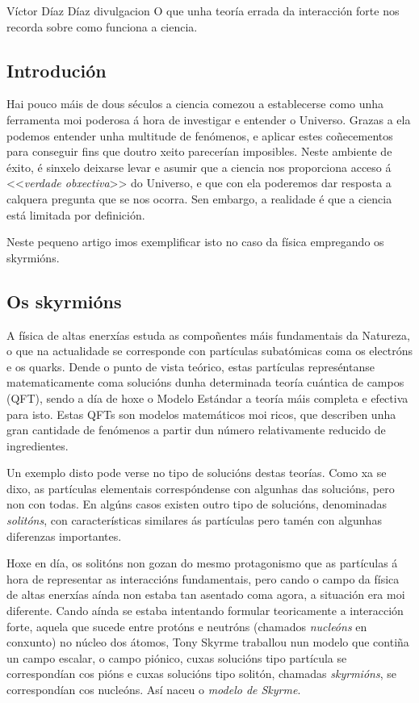 {Víctor Díaz Díaz}
{divulgacion}
{O que unha teoría errada da interacción forte nos recorda sobre como funciona
a ciencia.}

\begin{multicols}{2}

\subsection*{Introdución}

Hai pouco máis de dous séculos a ciencia comezou a establecerse como unha
ferramenta moi poderosa á hora de investigar e entender o Universo. Grazas a
ela podemos entender unha multitude de fenómenos, e aplicar estes coñecementos
para conseguir fins que doutro xeito parecerían imposibles. Neste ambiente de
éxito, é sinxelo deixarse levar e asumir que a ciencia nos proporciona acceso á
<<\textit{verdade obxectiva}>> do Universo, e que con ela poderemos dar
resposta a calquera pregunta que se nos ocorra. Sen embargo, a realidade é que
a ciencia está limitada por definición.

Neste pequeno artigo imos exemplificar isto no caso da física empregando os
skyrmións.

\subsection*{Os skyrmións}

A física de altas enerxías estuda as compoñentes máis fundamentais da Natureza,
o que na actualidade se corresponde con partículas subatómicas coma os
electróns e os quarks. Dende o punto de vista teórico, estas partículas
represéntanse matematicamente coma solucións dunha determinada teoría cuántica
de campos (QFT), sendo a día de hoxe o Modelo Estándar a teoría máis completa e
efectiva para isto. Estas QFTs son modelos matemáticos moi ricos, que describen
unha gran cantidade de fenómenos a partir dun número relativamente reducido de
ingredientes.

Un exemplo disto pode verse no tipo de solucións destas teorías. Como xa se
dixo, as partículas elementais correspóndense con algunhas das solucións, pero
non con todas. En algúns casos existen outro tipo de solucións, denominadas
\textit{solitóns}, con características similares ás partículas pero tamén con
algunhas diferenzas importantes.

Hoxe en día, os solitóns non gozan do mesmo protagonismo que as partículas á
hora de representar as interaccións fundamentais, pero cando o campo da física
de altas enerxías aínda non estaba tan asentado coma agora, a situación era moi
diferente. Cando aínda se estaba intentando formular teoricamente a interacción
forte, aquela que sucede entre protóns e neutróns (chamados \textit{nucleóns}
en conxunto) no núcleo dos átomos, Tony Skyrme traballou nun modelo que contiña
un campo escalar, o campo piónico, cuxas solucións tipo partícula se
correspondían cos pións e cuxas solucións tipo solitón, chamadas
\textit{skyrmións}, se correspondían cos nucleóns. Así naceu o \textit{modelo
de Skyrme}.


\end{multicols}
